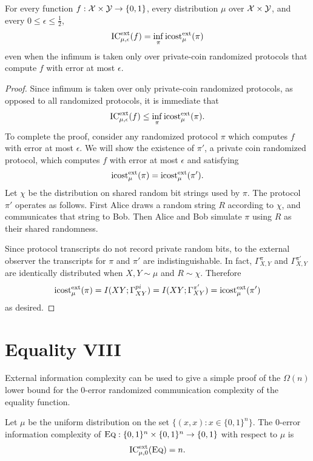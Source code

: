 \begin{theorem}
For every function $f : \mathcal{X} \times \mathcal{Y} \to \{0,1\}$, every distribution $\mu$ over $\mathcal{X} \times \mathcal{Y}$, and every $0 \le \epsilon \le \frac12$,
\[
\mathrm{IC}^{\mathrm{ext}}_{\mu,\epsilon}(f) = \inf_{\pi} \mathrm{icost}^{\mathrm{ext}}_\mu(\pi)
\]
even when the infimum is taken only over private-coin randomized protocols that compute $f$ with error at most $\epsilon$.
\end{theorem}

\begin{proof}
Since infimum is taken over only private-coin randomized protocols, as opposed to all randomized protocols, it is immediate that
$$\mathrm{IC}^{\mathrm{ext}}_{\mu,\epsilon}(f) \leq \inf_{\pi} \mathrm{icost}^{\mathrm{ext}}_\mu(\pi).$$
To complete the proof, consider any randomized protocol $\pi$ which computes $f$ with error at most $\epsilon$. We will show the existence of $\pi'$, a private coin randomized protocol, which computes $f$ with error at most $\epsilon$ and satisfying
$$\mathrm{icost}^{\mathrm{ext}}_\mu(\pi) = \mathrm{icost}^{\mathrm{ext}}_\mu(\pi').$$
Let $\chi$ be the distribution on shared random bit strings used by $\pi$. The protocol $\pi'$ operates as follows. First  Alice draws a random string $R$ according to $\chi$, and communicates that string to Bob. Then Alice and Bob simulate $\pi$ using $R$ as their shared randomness.

Since protocol transcripts do not record private random bits, to the external observer the transcripts for $\pi$ and $\pi'$ are indistinguishable. In fact, $\Gamma_{X,Y}^\pi$ and $\Gamma_{X,Y}^{\pi'}$ are identically distributed when $X,Y \sim \mu$ and $R\sim \chi$. Therefore
$$\mathrm{icost}^{\mathrm{ext}}_\mu(\pi) = I(XY;\Gamma^{pi}_{XY}) = I(XY;\Gamma^{\pi'}_{XY}) = \mathrm{icost}^{\mathrm{ext}}_\mu(\pi')$$
as desired.
\end{proof}


\newpage 
\section{Equality VIII}

External information complexity can be used to give a simple proof of the $\Omega(n)$ lower bound for the $0$-error randomized communication complexity of the equality function.

\begin{theorem}
Let $\mu$ be the uniform distribution on the set $\{(x,x) : x \in \{0,1\}^n\}$. The $0$-error information complexity of $\textsc{Eq} : \{0,1\}^n \times \{0,1\}^n \to \{0,1\}$ with respect to $\mu$ is
\[
\mathrm{IC}^{\mathrm{ext}}_{\mu,0}(\textsc{Eq}) = n.
\]
\end{theorem}

